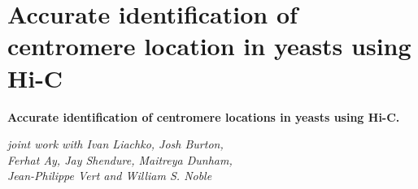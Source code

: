 \documentclass[xcolor=dvipsnames]{beamer}
\begin{document}
\section{Accurate identification of centromere location in yeasts using Hi-C}
\begin{frame}
\Large{ \bf
Accurate identification of centromere locations in yeasts using Hi-C.}

\begin{flushright}
\vspace{1em}
\small

\textit{joint work with  Ivan Liachko, Josh Burton, \\
Ferhat Ay, Jay Shendure, Maitreya Dunham, \\ Jean-Philippe Vert and William S.
Noble 
}
\end{flushright}

\end{frame}
\end{document}
